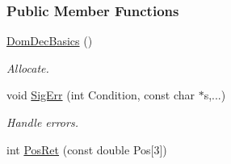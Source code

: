 \subsubsection*{Public Member Functions}
\begin{DoxyCompactItemize}
\item 
\hyperlink{classDomDecBasics_aec40201a10397aa0c646f6dcb31d03d9}{Dom\+Dec\+Basics} ()
\begin{DoxyCompactList}\small\item\em Allocate. \end{DoxyCompactList}\item 
void \hyperlink{classDomDecBasics_a013bde7a8eb6c66e70ab5d90959af2c2}{Sig\+Err} (int Condition, const char $\ast$s,...)
\begin{DoxyCompactList}\small\item\em Handle errors. \end{DoxyCompactList}\item 
int \hyperlink{classDomDecBasics_ad10ce7d8491ba213cdbc79d4dd4dc013}{Pos\+Ret} (const double Pos\mbox{[}3\mbox{]})\hypertarget{classDomDecBasics_ad10ce7d8491ba213cdbc79d4dd4dc013}{}\label{classDomDecBasics_ad10ce7d8491ba213cdbc79d4dd4dc013}


\end{DoxyCompactItemize}
